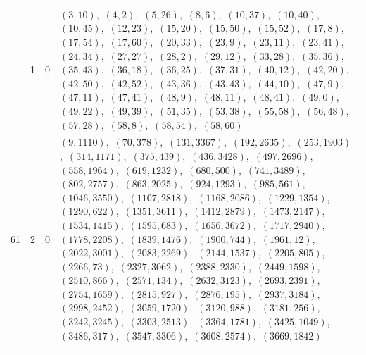 \documentclass[11pt]{article}
\begin{document}
\begin{longtable}{@{}rrl>{\raggedright\arraybackslash}p{}@{}}
\addlinespace[3pt]
61 & 1 & $0$ & $(3,10)$,\allowbreak\ $(4,2)$,\allowbreak\ $(5,26)$,\allowbreak\ $(8,6)$,\allowbreak\ $(10,37)$,\allowbreak\ $(10,40)$,\allowbreak\ $(10,45)$,\allowbreak\ $(12,23)$,\allowbreak\ $(15,20)$,\allowbreak\ $(15,50)$,\allowbreak\ $(15,52)$,\allowbreak\ $(17,8)$,\allowbreak\ $(17,54)$,\allowbreak\ $(17,60)$,\allowbreak\ $(20,33)$,\allowbreak\ $(23,9)$,\allowbreak\ $(23,11)$,\allowbreak\ $(23,41)$,\allowbreak\ $(24,34)$,\allowbreak\ $(27,27)$,\allowbreak\ $(28,2)$,\allowbreak\ $(29,12)$,\allowbreak\ $(33,28)$,\allowbreak\ $(35,36)$,\allowbreak\ $(35,43)$,\allowbreak\ $(36,18)$,\allowbreak\ $(36,25)$,\allowbreak\ $(37,31)$,\allowbreak\ $(40,12)$,\allowbreak\ $(42,20)$,\allowbreak\ $(42,50)$,\allowbreak\ $(42,52)$,\allowbreak\ $(43,36)$,\allowbreak\ $(43,43)$,\allowbreak\ $(44,10)$,\allowbreak\ $(47,9)$,\allowbreak\ $(47,11)$,\allowbreak\ $(47,41)$,\allowbreak\ $(48,9)$,\allowbreak\ $(48,11)$,\allowbreak\ $(48,41)$,\allowbreak\ $(49,0)$,\allowbreak\ $(49,22)$,\allowbreak\ $(49,39)$,\allowbreak\ $(51,35)$,\allowbreak\ $(53,38)$,\allowbreak\ $(55,58)$,\allowbreak\ $(56,48)$,\allowbreak\ $(57,28)$,\allowbreak\ $(58,8)$,\allowbreak\ $(58,54)$,\allowbreak\ $(58,60)$\\
61 & 2 & $0$ & $(9,1110)$,\allowbreak\ $(70,378)$,\allowbreak\ $(131,3367)$,\allowbreak\ $(192,2635)$,\allowbreak\ $(253,1903)$,\allowbreak\ $(314,1171)$,\allowbreak\ $(375,439)$,\allowbreak\ $(436,3428)$,\allowbreak\ $(497,2696)$,\allowbreak\ $(558,1964)$,\allowbreak\ $(619,1232)$,\allowbreak\ $(680,500)$,\allowbreak\ $(741,3489)$,\allowbreak\ $(802,2757)$,\allowbreak\ $(863,2025)$,\allowbreak\ $(924,1293)$,\allowbreak\ $(985,561)$,\allowbreak\ $(1046,3550)$,\allowbreak\ $(1107,2818)$,\allowbreak\ $(1168,2086)$,\allowbreak\ $(1229,1354)$,\allowbreak\ $(1290,622)$,\allowbreak\ $(1351,3611)$,\allowbreak\ $(1412,2879)$,\allowbreak\ $(1473,2147)$,\allowbreak\ $(1534,1415)$,\allowbreak\ $(1595,683)$,\allowbreak\ $(1656,3672)$,\allowbreak\ $(1717,2940)$,\allowbreak\ $(1778,2208)$,\allowbreak\ $(1839,1476)$,\allowbreak\ $(1900,744)$,\allowbreak\ $(1961,12)$,\allowbreak\ $(2022,3001)$,\allowbreak\ $(2083,2269)$,\allowbreak\ $(2144,1537)$,\allowbreak\ $(2205,805)$,\allowbreak\ $(2266,73)$,\allowbreak\ $(2327,3062)$,\allowbreak\ $(2388,2330)$,\allowbreak\ $(2449,1598)$,\allowbreak\ $(2510,866)$,\allowbreak\ $(2571,134)$,\allowbreak\ $(2632,3123)$,\allowbreak\ $(2693,2391)$,\allowbreak\ $(2754,1659)$,\allowbreak\ $(2815,927)$,\allowbreak\ $(2876,195)$,\allowbreak\ $(2937,3184)$,\allowbreak\ $(2998,2452)$,\allowbreak\ $(3059,1720)$,\allowbreak\ $(3120,988)$,\allowbreak\ $(3181,256)$,\allowbreak\ $(3242,3245)$,\allowbreak\ $(3303,2513)$,\allowbreak\ $(3364,1781)$,\allowbreak\ $(3425,1049)$,\allowbreak\ $(3486,317)$,\allowbreak\ $(3547,3306)$,\allowbreak\ $(3608,2574)$,\allowbreak\ $(3669,1842)$\\
\addlinespace[3pt]
\end{longtable}
\endgroup
\end{document}
